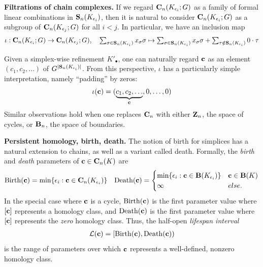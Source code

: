  

\noindent \textbf{Filtrations of chain complexes.} If we regard $\mathbf{C}_n(K_{\epsilon_i}; G)$ as a family of formal linear combinations in $\mathbf{S}_n(K_{\epsilon_i})$, then it is natural to consider $\mathbf{C}_n(K_{\epsilon_i}; G)$ as a subgroup of $\mathbf{C}_n(K_{\epsilon_{j}}; G)$ for all $i<j$.  In particular, we have an inclusion map     \begin{align*}
    \textstyle
    \iota: \mathbf{C}_n(K_{\epsilon_i}; G) \to \mathbf{C}_n(K_{\epsilon_j}; G),
    \quad
    \sum_{\sigma \in \mathbf{S}_n(K_{\epsilon_i})} x_\sigma \sigma
    \mapsto
    \sum_{\sigma \in \mathbf{S}_n(K_{\epsilon_i})} x_\sigma \sigma
    +
    \sum_{\tau \notin \mathbf{S}_n(K_{\epsilon_i})} 
    0 \cdot \tau
    \end{align*}

Given a simplex-wise refinement $K'_\bullet$, one can naturally regard $\mathbf{c}$ as an element  $(c_1, c_2,  \ldots)$ of $ G^{|\mathbf{S}_n(K_{\epsilon_i})|}$.  From this perspective, $\iota$ has a particularly simple interpretation, namely  ``padding'' by zeros:
    \begin{align*}
        \iota(\mathbf{c}) = ( \underbrace{c_1, c_2, \ldots}_{\mathbf{c}}, 0, \ldots, 0)
    \end{align*}
Similar observations hold when one replaces $\mathbf{C}_n$ with either $\mathbf{Z}_n$, the space of cycles, or $\mathbf{B}_n$, the space of boundaries.



\noindent \textbf{Persistent homology, birth, death.} The notion of birth for simplices has a natural extension to chains, as well as a variant called death.  Formally,  the \emph{birth} and \emph{death} parameters of  $\mathbf{c} \in \mathbf{C}_n(K)$ are 
    \begin{align*}
    \mathrm{Birth}(\mathbf{c}) = \min \{\epsilon_i : \mathbf{c} \in \mathbf{C}_n(K_{\epsilon_i}) \}
    &&
    \mathrm{Death}(\mathbf{c}) 
    = 
    \begin{cases}
    \min \{\epsilon_i : \mathbf{c} \in \mathbf{B}(K_{\epsilon_i}) \} & \mathbf{c} \in \mathbf{B}(K)
    \\
    \infty & else.
    \end{cases}
    \end{align*}
In the special case where $\mathbf{c}$ is a cycle,  $\mathrm{Birth}(\mathbf{c})$ is the first parameter value where $[\mathbf{c}]$ represents a homology class, and $\mathrm{Death}(\mathbf{c})$ is the first parameter value where $[\mathbf{c}]$ represents the \emph{zero} homology class.   Thus, the half-open
\emph{lifespan interval} 
    \begin{align*}
        \mathcal{L}(\mathbf{c}) = [\mathrm{Birth}(\mathbf{c}), \mathrm{Death}(\mathbf{c}))
    \end{align*}
is the range of parameters over which $\mathbf{c}$ represents a well-defined, nonzero homology class.

